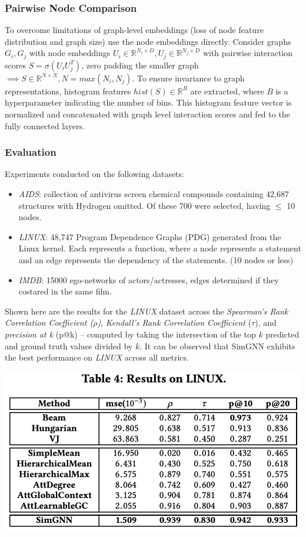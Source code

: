 \documentclass{article}
\begin{document}
\subsubsection{Pairwise Node Comparison}
To overcome limitations of graph-level embeddings (loss of node feature distribution and graph size) use the node embeddings directly.
Consider graphs $G_i, G_j$ with node embeddings $U_i \in \mathbb{R}^{N_i \times D}, U_j \in \mathbb{R}^{N_j \times D}$ with pairwise interaction scores $S = \sigma(U_iU_j^T)$, zero padding the smaller graph $\implies S \in \mathbb{R}^{N \times N}, N = max(N_i, N_j)$.
To ensure invariance to graph representations, histogram features $hist(S) \in \mathbb{R}^B$ are extracted, where $B$ is a hyperparameter indicating the number of bins. This histogram feature vector is normalized and concatenated with graph level interaction scores and fed to the fully connected layers.

\subsubsection{Evaluation}
Experiments conducted on the following datasets:
\begin{itemize}
    \item \textit{AIDS}: collection of antivirus screen chemical compounds containing 42,687 structures with Hydrogen omitted. Of these 700 were selected, having $\leq$ 10 nodes.
    \item \textit{LINUX}: 48,747 Program Dependence Graphs (PDG) generated from the Linux kernel. Each represents a function, where a node represents a statement and an edge represents the dependency of the statements. (10 nodes or less)
    \item \textit{IMDB}: 15000 ego-networks of actors/actresses, edges determined if they costared in the same film.
\end{itemize}
Shown here are the results for the \textit{LINUX} dataset across the \textit{Spearman's Rank Correlation Coefficient ($\rho$)}, \textit{Kendall's Rank Correlation Coefficient} ($\tau$), and \textit{precision at k} (p@k) – computed by taking the intersection of the top $k$ predicted and ground truth values divided by $k$.
It can be observed that SimGNN exhibits the best performance on \textit{LINUX} across all metrics.
\centerline{\includegraphics[width=\columnwidth]{Images/Similarity2-2.png}}
\end{document}
